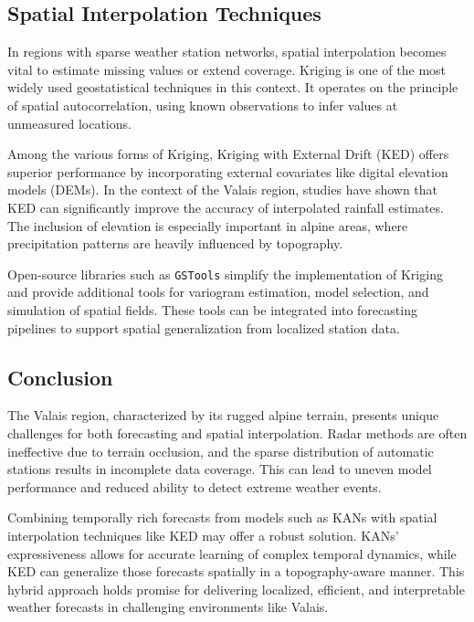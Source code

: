\subsection{Spatial Interpolation Techniques}

In regions with sparse weather station networks, spatial interpolation becomes vital to estimate missing values or extend coverage. Kriging is one of the most widely used geostatistical techniques in this context. It operates on the principle of spatial autocorrelation, using known observations to infer values at unmeasured locations.

Among the various forms of Kriging, Kriging with External Drift (KED) offers superior performance by incorporating external covariates like digital elevation models (DEMs). In the context of the Valais region, studies have shown that KED can significantly improve the accuracy of interpolated rainfall estimates.\cite{foehn2018spatial} The inclusion of elevation is especially important in alpine areas, where precipitation patterns are heavily influenced by topography.

Open-source libraries such as \texttt{GSTools} simplify the implementation of Kriging and provide additional tools for variogram estimation, model selection, and simulation of spatial fields.\cite{muller2022gstools} These tools can be integrated into forecasting pipelines to support spatial generalization from localized station data.

\subsection{Conclusion}

The Valais region, characterized by its rugged alpine terrain, presents unique challenges for both forecasting and spatial interpolation. Radar methods are often ineffective due to terrain occlusion, and the sparse distribution of automatic stations results in incomplete data coverage. This can lead to uneven model performance and reduced ability to detect extreme weather events.

Combining temporally rich forecasts from models such as KANs with spatial interpolation techniques like KED may offer a robust solution. KANs' expressiveness allows for accurate learning of complex temporal dynamics, while KED can generalize those forecasts spatially in a topography-aware manner. This hybrid approach holds promise for delivering localized, efficient, and interpretable weather forecasts in challenging environments like Valais.
